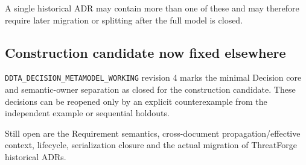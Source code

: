 \documentclass[
  10pt,
]{article}
\begin{document}
A single historical ADR may contain more than one of these and may
therefore require later migration or splitting after the full model is
closed.

\subsection{Construction candidate now fixed
elsewhere}\label{construction-candidate-now-fixed-elsewhere}

\texttt{DDTA\_DECISION\_METAMODEL\_WORKING} revision 4 marks the minimal
Decision core and semantic-owner separation as closed for the
construction candidate. These decisions can be reopened only by an
explicit counterexample from the independent example or sequential
holdouts.

Still open are the Requirement semantics, cross-document
propagation/effective context, lifecycle, serialization closure and the
actual migration of ThreatForge historical ADRs.
\end{document}

